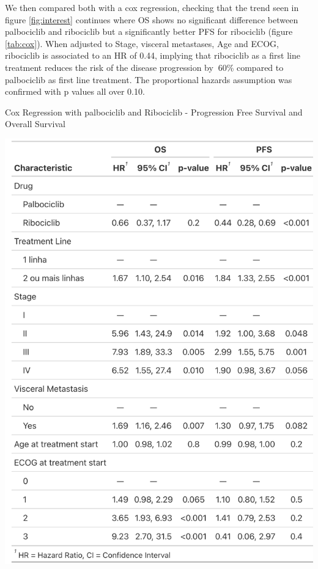 We then compared both with a cox regression, checking that the trend seen in figure  \ref{fig:interest} continues where OS shows no significant difference between palbociclib and ribociclib but a significantly better PFS for ribociclib (figure \ref*{tab:cox}). When adjusted to Stage, visceral metastases, Age and ECOG, ribociclib is associated to an HR of 0.44, implying that ribociclib as a first line treatment reduces the risk of the disease progression by $~$60\% compared to palbociclib as first line treatment. The proportional hazards assumption was confirmed with p values all over 0.10.
\begin{table}[ht]
  \centering
  \caption{Cox Regression with palbociclib and Ribociclib - Progression Free Survival and Overall Survival}\label{tab:cox} 
  \includegraphics[scale=0.25]{figures/cox_both.png}%

\end{table}

